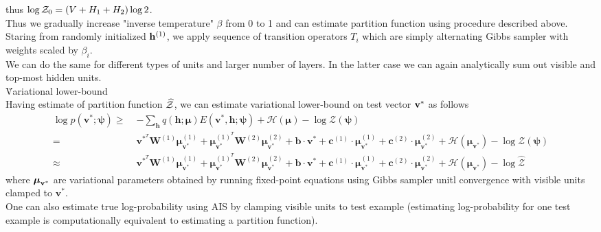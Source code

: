 \eg
thus $ \log \mathcal{Z}_0=(V+H_1+H_2)\log 2$.
\\[1em]
Thus we gradually increase "inverse temperature" $\beta$ from 0 to 1 and can estimate partition function using procedure described above. Staring from randomly initialized $\mathbf{h}^{(1)}$, we apply sequence of transition operators $T_i$ which are simply alternating Gibbs sampler with weights scaled by $\beta_i$.
\\[1em]
We can do the same for different types of units and larger number of layers. In the latter case we can again analytically sum out visible and top-most hidden units.
\\[0.5em]
\u{Variational lower-bound}
\\
Having estimate of partition function $\widehat{\mathcal{Z}}$, we can estimate variational lower-bound on test vector $\mathbf{v}^*$ as follows
\begin{equation}
\begin{aligned}
\log p(\mathbf{v}^{*};\boldsymbol{\psi})\geq\;&-\sum_{\mathbf{h}} q(\mathbf{h};\boldsymbol{\mu})E(\mathbf{v}^{*}, \mathbf{h};\boldsymbol{\psi})+\mathcal{H}(\boldsymbol{\mu})-\log\mathcal{Z}(\boldsymbol{\psi})
\\
=\;& \mathbf{v}^{*^{T}}\mathbf{W}^{(1)}\boldsymbol{\mu}_{\mathbf{v}^*}^{(1)}+\boldsymbol{\mu}_{\mathbf{v}^*}^{(1)^{T}}\mathbf{W}^{(2)}\boldsymbol{\mu}_{\mathbf{v}^*}^{(2)}+\mathbf{b}\cdot\mathbf{v}^{*}+\mathbf{c}^{(1)}\cdot\boldsymbol{\mu}_{\mathbf{v}^*}^{(1)}+\mathbf{c}^{(2)}\cdot\boldsymbol{\mu}_{\mathbf{v}^*}^{(2)}+\mathcal{H}(\boldsymbol{\mu}_{\mathbf{v}^*})-\log\mathcal{Z}(\boldsymbol{\psi})
\\
\approx\;& \mathbf{v}^{*^{T}}\mathbf{W}^{(1)}\boldsymbol{\mu}_{\mathbf{v}^*}^{(1)}+\boldsymbol{\mu}_{\mathbf{v}^*}^{(1)^{T}}\mathbf{W}^{(2)}\boldsymbol{\mu}_{\mathbf{v}^*}^{(2)}+\mathbf{b}\cdot\mathbf{v}^{*}+\mathbf{c}^{(1)}\cdot\boldsymbol{\mu}_{\mathbf{v}^*}^{(1)}+\mathbf{c}^{(2)}\cdot\boldsymbol{\mu}_{\mathbf{v}^*}^{(2)}+\mathcal{H}(\boldsymbol{\mu}_{\mathbf{v}^*})-\log\widehat{\mathcal{Z}}
\end{aligned}
\end{equation}
where $\boldsymbol{\mu}_{\mathbf{v}^*}$ are variational parameters obtained by running fixed-point equations using Gibbs sampler unitl convergence with visible units clamped to $\mathbf{v}^*$.
\\[1em]
One can also estimate true log-probability using AIS by clamping visible units to test example (estimating log-probability for one test example is computationally equivalent to estimating a partition function).

